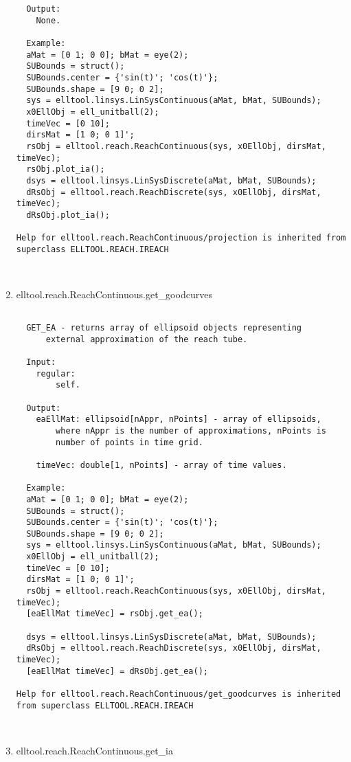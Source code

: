 \begin{enumerate}
\begin{lstlisting}
  Output:
    None.

  Example:
  aMat = [0 1; 0 0]; bMat = eye(2);
  SUBounds = struct();
  SUBounds.center = {'sin(t)'; 'cos(t)'};
  SUBounds.shape = [9 0; 0 2];
  sys = elltool.linsys.LinSysContinuous(aMat, bMat, SUBounds);
  x0EllObj = ell_unitball(2);
  timeVec = [0 10];
  dirsMat = [1 0; 0 1]';
  rsObj = elltool.reach.ReachContinuous(sys, x0EllObj, dirsMat, timeVec);
  rsObj.plot_ia();
  dsys = elltool.linsys.LinSysDiscrete(aMat, bMat, SUBounds);
  dRsObj = elltool.reach.ReachDiscrete(sys, x0EllObj, dirsMat, timeVec);
  dRsObj.plot_ia();

Help for elltool.reach.ReachContinuous/projection is inherited from superclass ELLTOOL.REACH.IREACH



\end{lstlisting}
\fontfamily{\familydefault}
\selectfont
\item {elltool.reach.ReachContinuous.get\_goodcurves}
\selectfont
\begin{lstlisting}

  GET_EA - returns array of ellipsoid objects representing
      external approximation of the reach tube.

  Input:
    regular:
        self.

  Output:
    eaEllMat: ellipsoid[nAppr, nPoints] - array of ellipsoids,
        where nAppr is the number of approximations, nPoints is
        number of points in time grid.

    timeVec: double[1, nPoints] - array of time values.

  Example:
  aMat = [0 1; 0 0]; bMat = eye(2);
  SUBounds = struct();
  SUBounds.center = {'sin(t)'; 'cos(t)'};
  SUBounds.shape = [9 0; 0 2];
  sys = elltool.linsys.LinSysContinuous(aMat, bMat, SUBounds);
  x0EllObj = ell_unitball(2);
  timeVec = [0 10];
  dirsMat = [1 0; 0 1]';
  rsObj = elltool.reach.ReachContinuous(sys, x0EllObj, dirsMat, timeVec);
  [eaEllMat timeVec] = rsObj.get_ea();

  dsys = elltool.linsys.LinSysDiscrete(aMat, bMat, SUBounds);
  dRsObj = elltool.reach.ReachDiscrete(sys, x0EllObj, dirsMat, timeVec);
  [eaEllMat timeVec] = dRsObj.get_ea();

Help for elltool.reach.ReachContinuous/get_goodcurves is inherited from superclass ELLTOOL.REACH.IREACH



\end{lstlisting}
\fontfamily{\familydefault}
\selectfont
\item {elltool.reach.ReachContinuous.get\_ia}
\selectfont
\begin{lstlisting}


\end{lstlisting}
\end{enumerate}
